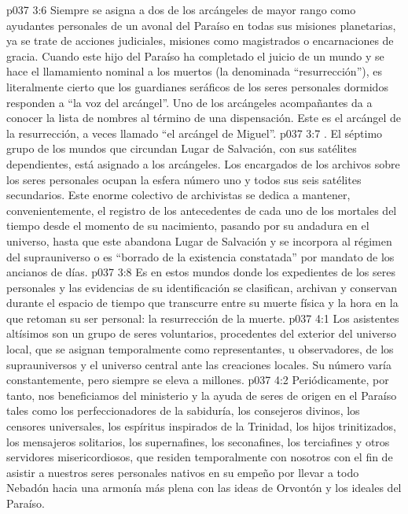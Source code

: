 \vs p037 3:6 Siempre se asigna a dos de los arcángeles de mayor rango como ayudantes personales de un avonal del Paraíso en todas sus misiones planetarias, ya se trate de acciones judiciales, misiones como magistrados o encarnaciones de gracia. Cuando este hijo del Paraíso ha completado el juicio de un mundo y se hace el llamamiento nominal a los muertos (la denominada “resurrección”), es literalmente cierto que los guardianes seráficos de los seres personales dormidos responden a “la voz del arcángel”. Uno de los arcángeles acompañantes da a conocer la lista de nombres al término de una dispensación. Este es el arcángel de la resurrección, a veces llamado “el arcángel de Miguel”.
\vs p037 3:7 \pc {}. El séptimo grupo de los mundos que circundan Lugar de Salvación, con sus satélites dependientes, está asignado a los arcángeles. Los encargados de los archivos sobre los seres personales ocupan la esfera número uno y todos sus seis satélites secundarios. Este enorme colectivo de archivistas se dedica a mantener, convenientemente, el registro de los antecedentes de cada uno de los mortales del tiempo desde el momento de su nacimiento, pasando por su andadura en el universo, hasta que este abandona Lugar de Salvación y se incorpora al régimen del suprauniverso o es “borrado de la existencia constatada” por mandato de los ancianos de días.
\vs p037 3:8 Es en estos mundos donde los expedientes de los seres personales y las evidencias de su identificación se clasifican, archivan y conservan durante el espacio de tiempo que transcurre entre su muerte física y la hora en la que retoman su ser personal: la resurrección de la muerte.
\vs p037 4:1 Los asistentes altísimos son un grupo de seres voluntarios, procedentes del exterior del universo local, que se asignan temporalmente como representantes, u observadores, de los suprauniversos y el universo central ante las creaciones locales. Su número varía constantemente, pero siempre se eleva a millones.
\vs p037 4:2 Periódicamente, por tanto, nos beneficiamos del ministerio y la ayuda de seres de origen en el Paraíso tales como los perfeccionadores de la sabiduría, los consejeros divinos, los censores universales, los espíritus inspirados de la Trinidad, los hijos trinitizados, los mensajeros solitarios, los supernafines, los seconafines, los terciafines y otros servidores misericordiosos, que residen temporalmente con nosotros con el fin de asistir a nuestros seres personales nativos en su empeño por llevar a todo Nebadón hacia una armonía más plena con las ideas de Orvontón y los ideales del Paraíso.
